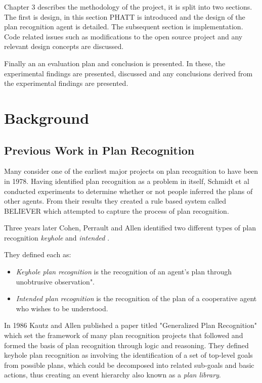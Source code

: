 \documentclass[parskip]{cs4rep}
\begin{document}
Chapter 3 describes the methodology of the project, it is split into two sections. The first is design, in this section PHATT is introduced and the design of the plan recognition agent is detailed. The subsequent section is implementation. Code related issues such as modifications to the open source project and any relevant design concepts are discussed. 

Finally an an evaluation plan and conclusion is presented. In these, the experimental findings are presented, discussed and any conclusions derived from the experimental findings are presented.

\chapter{Background}

\section{Previous Work in Plan Recognition}

Many consider one of the earliest major projects on plan recognition to have been in 1978. Having identified plan recognition as a problem in itself, Schmidt et al \cite{journals/ai/SchmidtSG78} conducted experiments to determine whether or not people inferred the plans of other agents. From their results they created a rule based system called BELIEVER which attempted to capture the process of plan recognition. 

Three years later Cohen, Perrault and Allen identified two different types of plan recognition \textit{keyhole} and \textit{intended} \cite{Cohen82a}. 

They defined each as:

\begin{itemize}
\item
\textit{Keyhole plan recognition} is the recognition of an agent's plan through unobtrusive observation".
\item
\textit{Intended plan recognition} is the recognition of the plan of a cooperative agent who wishes to be understood.
\end{itemize}

In 1986 Kautz and Allen published a paper titled "Generalized Plan Recognition" \cite{conf/aaai/KautzA86} which set the framework of many plan recognition projects that followed and formed the basis of plan recognition through logic and reasoning. They defined keyhole plan recognition as involving the identification of a set of top-level goals from possible plans, which could be decomposed into related sub-goals and basic actions, thus creating an event hierarchy also known as a \textit{plan library}. 
\end{document}
